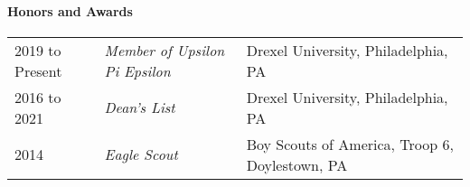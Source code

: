\documentclass[9pt,]{article}
\let\oldparagraph\paragraph
\renewcommand{\paragraph}[1]{\oldparagraph{#1}\mbox{}}
\begin{document}
%
%


\hypertarget{honors-and-awards}{%
\paragraph{Honors and Awards}\label{honors-and-awards}}

\begin{tabularx}{\textwidth}{l | l X}
	2019 to Present & \textit{Member of Upsilon Pi Epsilon} & \hfill Drexel University, Philadelphia, PA\\
	2016 to 2021 &  \textit{Dean's List} & \hfill Drexel University, Philadelphia, PA\\
	2014         & \textit{Eagle Scout} & \hfill Boy Scouts of America, Troop 6, Doylestown, PA\\
\end{tabularx}

%
\end{document}
